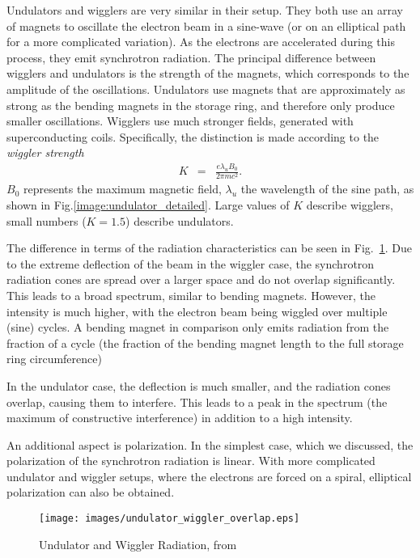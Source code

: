 \documentclass[a4paper,10pt]{article}
\begin{document}
    Undulators and wigglers are very similar in their setup. They both use an
array of magnets to oscillate the electron beam in a sine-wave (or on an
elliptical path for a more complicated variation). As the electrons are
accelerated during this process, they emit synchrotron radiation. The principal
difference between wigglers and undulators is the strength of the magnets, which
corresponds to the amplitude of the oscillations. Undulators use magnets that
are approximately as strong as the bending magnets in the storage ring, and
therefore only produce smaller oscillations. Wigglers use much stronger fields,
generated with superconducting coils. Specifically, the distinction is made
according to the \emph{wiggler strength}
\begin{eqnarray}
  K &=& \frac{e \lambda_u B_0}{2 \pi m c^2}.\label{eq:undulator_wiggler_k}
\end{eqnarray}
$B_0$ represents the maximum magnetic field, $\lambda_u$ the wavelength of the
sine path, as shown in Fig.\ref{image:undulator_detailed}. Large
values of $K$ describe wigglers, small numbers ($K=1.5$)
describe undulators.

    The difference in terms of the radiation characteristics can be seen in
Fig.~\ref{image:undulator_wiggler_overlap}. Due to the extreme deflection of
the beam in the wiggler case, the synchrotron radiation cones are spread over a
larger space and do not overlap significantly. This leads to a broad spectrum,
similar to bending magnets. However, the intensity is much higher, with the
electron beam being wiggled over multiple (sine) cycles. A bending magnet in
comparison only emits radiation from the fraction of a cycle (the fraction of
the bending magnet length to the full storage ring circumference) 

    In the undulator case, the deflection is much smaller, and the radiation
cones overlap, causing them to interfere. This leads to a peak in the spectrum
(the maximum of constructive interference) in addition to a high intensity.

    An additional aspect is polarization. In the simplest case, which we
discussed, the polarization of the synchrotron radiation is linear. With more
complicated undulator and wiggler setups, where the electrons are forced on a
spiral, elliptical polarization can also be obtained.


\begin{figure}[htbp]
    \centering
    \texttt{[image: images/undulator\_wiggler\_overlap.eps]}
    \caption{Undulator and Wiggler Radiation, from \citep{bessy}}
  \label{image:undulator_wiggler_overlap}
\end{figure}
\end{document}
